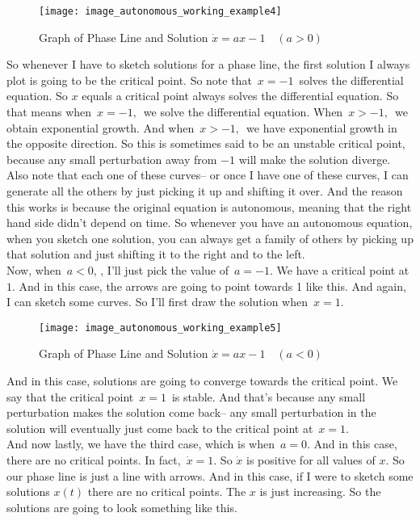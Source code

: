 \begin{enumerate}
  \begin{figure}[ht!]
    \centering
    \texttt{[image: image\_autonomous\_working\_example4]}
    \caption{Graph of Phase Line and Solution $\dot x = ax -1 \quad (a > 0)$}
  \end{figure}

  So whenever I have to sketch solutions for a phase line,
  the first solution I always plot is going to be the critical point.
  So note that $\, x = -1\,$ solves the differential equation.
  So $x$ equals a critical point always solves the differential  equation.
  So that means when $\, x = -1,\,$ we solve the differential equation.
  When $\, x > -1, \,$ we obtain exponential growth.
  And when $\, x > -1, \,$ we have exponential growth in the opposite direction.
  So this is sometimes said to be an unstable critical point,
  because any small perturbation away from $-1$ will make the solution diverge.
  Also note that each one of these curves--
  or once I have one of these curves, I can generate all the others by just picking it up and shifting
  it over.
  And the reason this works is because the original equation is autonomous,
  meaning that the right hand side didn't depend on time.
  So whenever you have an autonomous equation, when you sketch one solution,
  you can always get a family of others
  by picking up that solution and just shifting it to the right and to the left.\\

  Now, when $\, a < 0,\,$, I'll just pick the value of $\,a = -1$.
  We have a critical point at $1$.
  And in this case, the arrows are going to point towards 1 like this.
  And again, I can sketch some curves.
  So I'll first draw the solution when $\,x = 1$.

  \begin{figure}[ht!]
    \centering
    \texttt{[image: image\_autonomous\_working\_example5]}
    \caption{Graph of Phase Line and Solution $\dot x = ax -1 \quad (a < 0)$}
  \end{figure}
  
  And in this case, solutions are going to converge towards the critical point.
  We say that the critical point $\, x = 1\,$  is stable.
  And that's because any small perturbation makes the solution come back--
  any small perturbation in the solution will eventually just come back 
  to the critical point at $\, x = 1$. \\

  
  And now lastly, we have the third case, which is when $\, a = 0$.
  And in this case, there are no critical points.
  In fact, $\, \dot x  = 1$.
  So $\dot x$ is positive for all values of $x$.
  So our phase line is just a line with arrows.
  And in this case, if I were to sketch some solutions $x(t)$
  there are no critical points.  The $x$ is just increasing.
  So the solutions are going to look something like this.


\end{enumerate}
